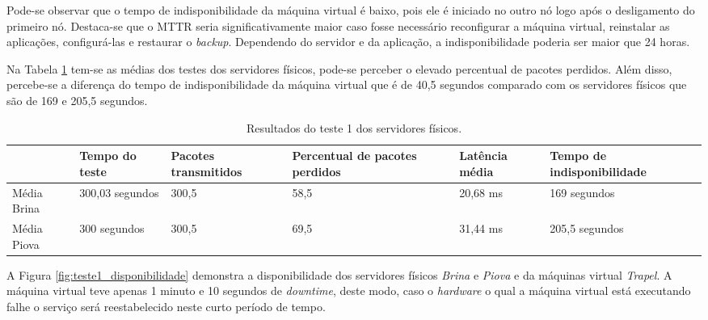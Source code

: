 Pode-se observar que o tempo de indisponibilidade da máquina virtual é baixo, pois ele é iniciado no outro nó logo após o desligamento do 
primeiro nó. Destaca-se que o \ac{MTTR} seria significativamente maior caso fosse necessário reconfigurar a máquina virtual, reinstalar as 
aplicações, configurá-las e restaurar o \textit{backup}. Dependendo do servidor e da aplicação, a indisponibilidade poderia ser maior que 24 horas.

Na Tabela \ref{tab:teste1resultados} tem-se as médias dos testes dos servidores físicos, pode-se perceber o elevado percentual de pacotes perdidos. 
Além disso, percebe-se a diferença do tempo de indisponibilidade da máquina virtual que é de 40,5 segundos comparado com os servidores 
físicos que são de 169 e 205,5 segundos.

\begin{table}[h!]
\caption{Resultados do teste 1 dos servidores físicos.}
\label{tab:teste1resultados}
\begin{center}
\begin{tabular}{|l|p{2.3cm}|p{2.2cm}|p{2.5cm}|p{2cm}|p{2.7cm}|}\hline
 & \textbf{Tempo do teste} & \textbf{Pacotes transmitidos} & \textbf{Percentual de pacotes perdidos} & \textbf{Latência média} & \textbf{Tempo de indisponibilidade} \\\hline
Média Brina & 300,03 segundos & 300,5 & 58,5 & 20,68 ms & 169 segundos \\\hline
Média Piova & 300 segundos & 300,5 & 69,5 & 31,44 ms & 205,5 segundos \\\hline
\end{tabular}
\end{center}
\end{table}

A Figura \ref{fig:teste1_disponibilidade} demonstra a disponibilidade dos servidores físicos \textit{Brina} e \textit{Piova} e da máquinas virtual 
\textit{Trapel}. A máquina virtual teve apenas 1 minuto e 10 segundos de \textit{downtime}, deste modo, caso o \textit{hardware} o qual a máquina
virtual está executando falhe o serviço será reestabelecido neste curto período de tempo.

